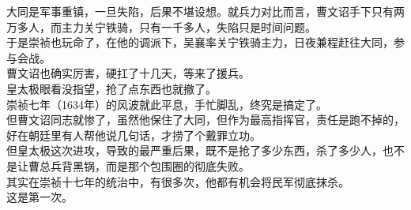 \begin{multicols}{\theparacolNo}
大同是军事重镇，一旦失陷，后果不堪设想。就兵力对比而言，曹文诏手下只有两万多人，而主力关宁铁骑，只有一千多人，失陷只是时间问题。\\

于是崇祯也玩命了，在他的调派下，吴襄率关宁铁骑主力，日夜兼程赶往大同，参与会战。\\

曹文诏也确实厉害，硬扛了十几天，等来了援兵。\\

皇太极眼看没指望，抢了点东西也就撤了。\\

崇祯七年（1634年）的风波就此平息，手忙脚乱，终究是搞定了。\\

但曹文诏同志就惨了，虽然他保住了大同，但作为最高指挥官，责任是跑不掉的，好在朝廷里有人帮他说几句话，才捞了个戴罪立功。\\

但皇太极这次进攻，导致的最严重后果，既不是抢了多少东西，杀了多少人，也不是让曹总兵背黑锅，而是那个包围圈的彻底失败。\\

其实在崇祯十七年的统治中，有很多次，他都有机会将民军彻底抹杀。\\

这是第一次。\\
\ifnum{}
	\end{multicols}
\fi
\newpage
